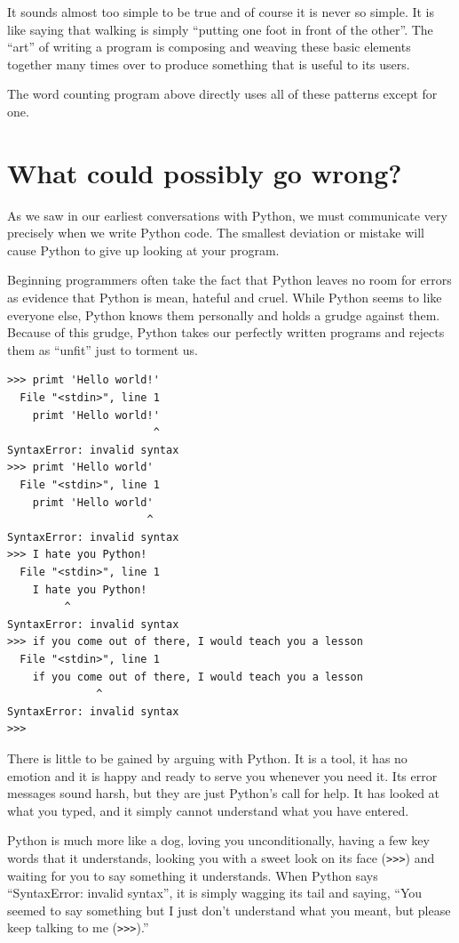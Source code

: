 It sounds almost too simple to be true and of course it is never
so simple.  It is like saying that walking is simply
``putting one foot in front of the other''.  The ``art'' 
of writing a program is composing and weaving these
basic elements together many times over to produce something
that is useful to its users.

The word counting program above directly uses all of 
these patterns except for one.

\section{What could possibly go wrong?}

As we saw in our earliest conversations with Python, we must
communicate very precisely when we write Python code.  The smallest
deviation or mistake will cause Python to give up looking at your
program.

Beginning programmers often take the fact that Python leaves no
room for errors as evidence that Python is mean, hateful and cruel.
While Python seems to like everyone else, Python knows them 
personally and holds a grudge against them.  Because of this grudge,
Python takes our perfectly written programs and rejects them as 
``unfit'' just to torment us.

\beforeverb
\begin{verbatim}
>>> primt 'Hello world!'
  File "<stdin>", line 1
    primt 'Hello world!'
                       ^
SyntaxError: invalid syntax
>>> primt 'Hello world'
  File "<stdin>", line 1
    primt 'Hello world'
                      ^
SyntaxError: invalid syntax
>>> I hate you Python!
  File "<stdin>", line 1
    I hate you Python!
         ^
SyntaxError: invalid syntax
>>> if you come out of there, I would teach you a lesson
  File "<stdin>", line 1
    if you come out of there, I would teach you a lesson
              ^
SyntaxError: invalid syntax
>>> 
\end{verbatim}
\afterverb
%
There is little to be gained by arguing with Python.  It is a tool,
it has no emotion and it is happy and ready to serve you whenever you
need it.  Its error messages sound harsh, but they are just Python's
call for help.  It has looked at what you typed, and it simply cannot
understand what you have entered.

Python is much more like a dog, loving you unconditionally, having a few
key words that it understands, looking you with a sweet look on its
face ({\tt >>>}) and waiting for you to say something it understands.
When Python says ``SyntaxError: invalid syntax'', it is simply wagging
its tail and saying, ``You seemed to say something but I just don't
understand what you meant, but please keep talking to me ({\tt >>>}).''

